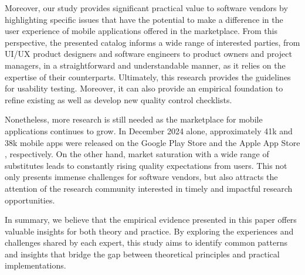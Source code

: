 \documentclass[preprint,12pt,number]{elsarticle}
\begin{document}
Moreover, our study provides significant practical value to software vendors by highlighting specific issues that have the potential to make a difference in the user experience of mobile applications offered in the marketplace. From this perspective, the presented catalog informs a wide range of interested parties, from UI/UX product designers and software engineers to product owners and project managers, in a straightforward and understandable manner, as it relies on the expertise of their counterparts.  Ultimately, this research provides the guidelines for usability testing. Moreover, it can also provide an empirical foundation to refine existing as well as develop new quality control checklists.

Nonetheless, more research is still needed as the marketplace for mobile applications continues to grow. In December 2024 alone, approximately 41k and 38k mobile apps were released on the Google Play Store \citep{Statista-Google-2024-XII} and the Apple App Store \citep{Statista-Apple-2024-XII}, respectively. On the other hand, market saturation with a wide range of substitutes leads to constantly rising quality expectations from users. This not only presents immense challenges for software vendors, but also attracts the attention of the research community interested in timely and impactful research opportunities. 

In summary, we believe that the empirical evidence presented in this paper offers valuable insights for both theory and practice. By exploring the experiences and challenges shared by each expert, this study aims to identify common patterns and insights that bridge the gap between theoretical principles and practical implementations.
\end{document}
